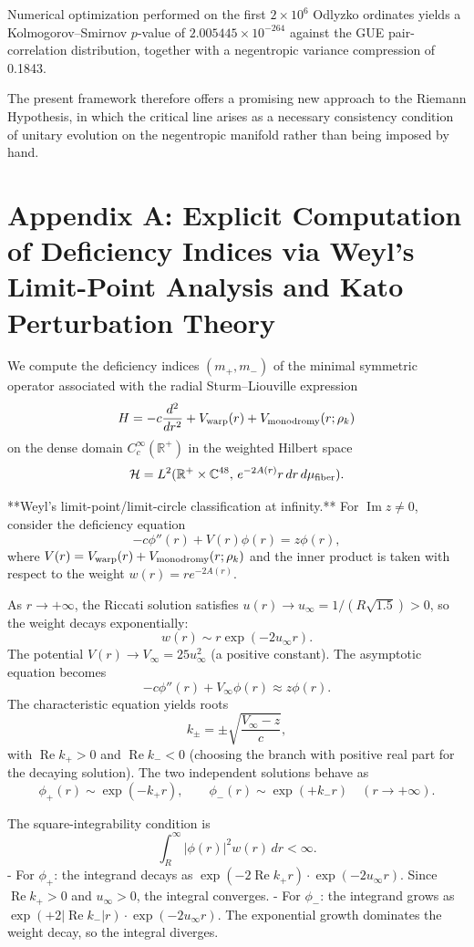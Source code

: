 \documentclass[11pt,a4paper]{article}
\begin{document}
Numerical optimization performed on the first \(2\times 10^6\) Odlyzko ordinates yields a Kolmogorov--Smirnov \(p\)-value of \(2.005445\times 10^{-264}\) against the GUE pair-correlation distribution, together with a negentropic variance compression of 0.1843.

The present framework therefore offers a promising new approach to the Riemann Hypothesis, in which the critical line arises as a necessary consistency condition of unitary evolution on the negentropic manifold rather than being imposed by hand.

\appendix

\section{Appendix A: Explicit Computation of Deficiency Indices via Weyl's Limit-Point Analysis and Kato Perturbation Theory}

We compute the deficiency indices \((m_+, m_-)\) of the minimal symmetric operator associated with the radial Sturm--Liouville expression
\[
H = -c \frac{d^2}{dr^2} + V_{\rm warp}(r) + V_{\rm monodromy}(r;\rho_k)
\]
on the dense domain \(C_c^\infty(\mathbb{R}^+)\) in the weighted Hilbert space
\[
\mathcal{H} = L^2(\mathbb{R}^+ \times \mathbb{C}^{48},\, e^{-2A(r)} r\,dr\,d\mu_{\rm fiber}).
\]

**Weyl's limit-point/limit-circle classification at infinity.**  
For \(\operatorname{Im} z \neq 0\), consider the deficiency equation
\[
-c \phi''(r) + V(r) \phi(r) = z \phi(r),
\]
where \(V(r) = V_{\rm warp}(r) + V_{\rm monodromy}(r;\rho_k)\) and the inner product is taken with respect to the weight \(w(r) = r e^{-2A(r)}\).

As \(r \to +\infty\), the Riccati solution satisfies \(u(r) \to u_\infty = 1/(R\sqrt{1.5}) > 0\), so the weight decays exponentially:
\[
w(r) \sim r \exp(-2 u_\infty r).
\]
The potential \(V(r) \to V_\infty = 25 u_\infty^2\) (a positive constant). The asymptotic equation becomes
\[
-c \phi''(r) + V_\infty \phi(r) \approx z \phi(r).
\]
The characteristic equation yields roots
\[
k_{\pm} = \pm \sqrt{\frac{V_\infty - z}{c}},
\]
with \(\operatorname{Re} k_+ > 0\) and \(\operatorname{Re} k_- < 0\) (choosing the branch with positive real part for the decaying solution). The two independent solutions behave as
\[
\phi_+(r) \sim \exp(-k_+ r), \qquad \phi_-(r) \sim \exp(+k_- r) \quad (r \to +\infty).
\]

The square-integrability condition is
\[
\int_R^\infty |\phi(r)|^2 w(r)\,dr < \infty.
\]
- For \(\phi_+\): the integrand decays as \(\exp(-2 \operatorname{Re} k_+ r) \cdot \exp(-2 u_\infty r)\). Since \(\operatorname{Re} k_+ > 0\) and \(u_\infty > 0\), the integral converges.
- For \(\phi_-\): the integrand grows as \(\exp(+2 |\operatorname{Re} k_-| r) \cdot \exp(-2 u_\infty r)\). The exponential growth dominates the weight decay, so the integral diverges.
\end{document}
